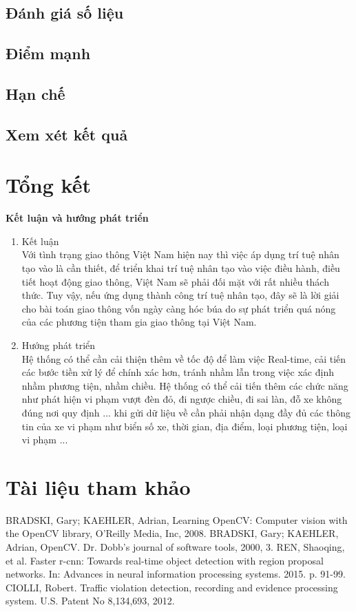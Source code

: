 \documentclass[12pt,twoside,a4paper]{article}
\begin{document}
\subsection{Đánh giá số liệu}
\subsection{Điểm mạnh}
\subsection{Hạn chế}
\subsection{Xem xét kết quả}
\section{Tổng kết}

\textbf {Kết luận và hướng phát triển}
\begin{enumerate}
	\item Kết luận \\
	Với tình trạng giao thông Việt Nam hiện nay thì việc áp dụng trí tuệ nhân tạo vào là cần thiết, để triển khai trí tuệ nhân tạo vào việc điều hành, điều tiết hoạt động giao thông, Việt Nam sẽ phải đối mặt với rất nhiều thách thức. Tuy vậy, nếu ứng dụng thành công trí tuệ nhân tạo, đây sẽ là lời giải cho bài toán giao thông vốn ngày càng hóc búa do sự phát triển quá nóng của các phương tiện tham gia giao thông tại Việt Nam.
	\item Hướng phát triển \\
	Hệ thống có thể cần cải thiện thêm về tốc độ để làm việc Real-time, cải tiến các bước tiền xử lý để chính xác hơn, tránh nhầm lẫn trong việc xác định nhầm phương tiện, nhầm chiều. Hệ thống có thể cải tiến thêm các chức năng như phát hiện vi phạm vượt đèn đỏ, đi ngược chiều, đi sai làn, đỗ xe không đúng nơi quy định ... khi gửi dữ liệu về cần phải nhận dạng đầy đủ các thông tin của xe vi phạm như biển số xe, thời gian, địa điểm, loại phương tiện, loại vi phạm ...
\end{enumerate}
\section{Tài liệu tham khảo}
\renewcommand{\labelenumi}{[\arabic{enumi}]}
\begin{thebibliography}{9}
	 BRADSKI, Gary; KAEHLER, Adrian, Learning OpenCV: Computer vision with the OpenCV library, O'Reilly Media, Inc, 2008.
	 BRADSKI, Gary; KAEHLER, Adrian, OpenCV. Dr. Dobb’s journal of software tools, 2000, 3.
	 REN, Shaoqing, et al. Faster r-cnn: Towards real-time object detection with region proposal networks. In: Advances in neural information processing systems. 2015. p. 91-99.
	 CIOLLI, Robert. Traffic violation detection, recording and evidence processing system. U.S. Patent No 8,134,693, 2012.
\end{thebibliography}
\end{document}
